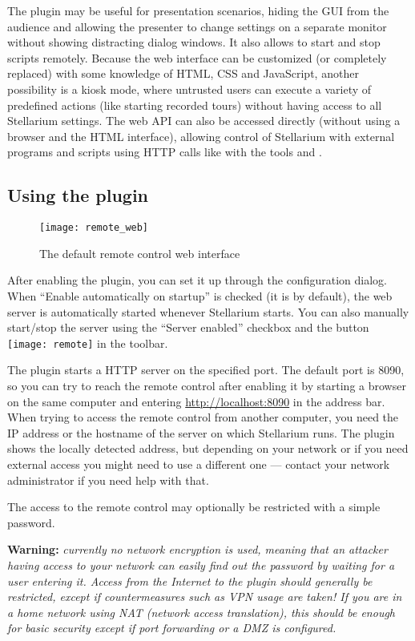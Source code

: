 The plugin may be useful for presentation scenarios, hiding the GUI from the 
audience and allowing the presenter to change settings on a separate monitor 
without showing distracting dialog windows. It also allows to start and stop 
scripts remotely. Because the web interface can be customized (or completely 
replaced) with some knowledge of HTML, CSS and JavaScript, another possibility 
is a kiosk mode, where untrusted users can execute a variety of predefined 
actions (like starting recorded tours) without having access to all Stellarium 
settings. The web API can also be accessed directly (without using a browser 
and the HTML interface), allowing control of Stellarium with external programs 
and scripts using HTTP calls like with the tools  and .

\subsection{Using the plugin}
\label{sec:plugins:RemoteControl:using}

\begin{figure}[h]
\centering\texttt{[image: remote\_web]}
\caption{The default remote control web interface}
\label{fig:plugins:RemoteControl:using}
\end{figure}

After enabling the plugin, you can set it up through the configuration dialog. 
When ``Enable automatically on startup'' is checked (it is by default), the web 
server is automatically started whenever Stellarium starts. You can also 
manually start/stop the server using the ``Server enabled'' checkbox and the 
button \texttt{[image: remote]} in the toolbar.

The plugin starts a HTTP server on the specified port. The default port is 
8090, so you can try to reach the remote control after enabling it by starting 
a browser on the same computer and entering \url{http://localhost:8090} in the 
address bar. When trying to access the remote control from another computer, 
you need the IP address or the hostname of the server on which Stellarium runs. 
The plugin shows the locally detected address, but depending on your network or 
if you need external access you might need to use a different one 
--- contact your network administrator if you need help with that.

The access to the remote control may optionally be restricted with a simple 
password.

\textbf{Warning:} \emph{currently no network encryption is used, meaning that 
an attacker having access to your network can easily find out the password by 
waiting for a user entering it. Access from the Internet to the 
plugin should generally be restricted, except if countermeasures such as VPN 
usage are taken! If you are in a home network using NAT (network access 
translation), this should be enough for basic security except if port 
forwarding or a DMZ is configured.}

